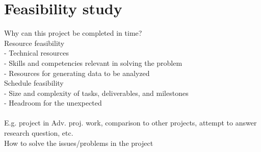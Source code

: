 \chapter{Feasibility study}
\label{chapter6:feasibility_study}

Why can this project be completed in time?  \\
Resource feasibility \\
- Technical resources \\
- Skills and competencies relevant in solving the problem  \\
- Resources for generating data to be analyzed  \\
Schedule feasibility \\
- Size and complexity of tasks, deliverables, and milestones \\
- Headroom for the unexpected \\ \\

E.g. project in Adv. proj. work, comparison to other projects, attempt to answer research question, etc. \\
How to solve the issues/problems in the project